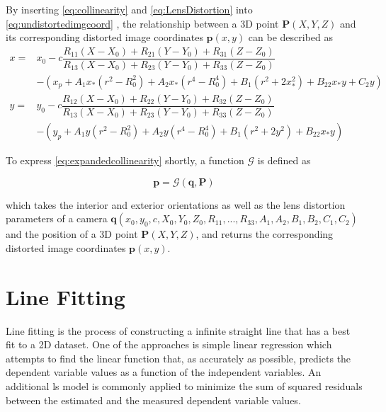 By inserting \eqref{eq:collinearity} and \eqref{eq:LensDistortion} into \eqref{eq:undistortedimgcoord} , the relationship between a 3D point $\mathbf{P}(X, Y, Z)$ and its corresponding distorted image coordinates $\mathbf{p}(x,y)$ can be described as
\begin{equation} \label{eq:expandedcollinearity}
\begin{split}
x =& x_0-c\dfrac{R_{11}(X-X_0)+R_{21}(Y-Y_0)+R_{31}(Z-Z_0)}{R_{13}(X-X_0)+R_{23}(Y-Y_0)+R_{33}(Z-Z_0)} \\
&-(x_p + A_1x_*(r^2-R_0^2) + A_2x_*(r^4-R_0^4) + B_1(r^2+2x_*^2) + B_22x_*y+C_2y)\\
y =& y_0-c\dfrac{R_{12}(X-X_0)+R_{22}(Y-Y_0)+R_{32}(Z-Z_0)}{R_{13}(X-X_0)+R_{23}(Y-Y_0)+R_{33}(Z-Z_0)} \\
&-(y_p + A_1y  (r^2-R_0^2) + A_2y  (r^4-R_0^4) + B_1(r^2+2y^2)   + B_22x_*y)
\end{split}
\end{equation}

To express \eqref{eq:expandedcollinearity} shortly, a function $\mathcal{G}$ is defined as

\begin{equation} \label{eq:Gfunction}
\mathbf{p} = \mathcal{G}(\mathbf{q},\mathbf{P}) 
\end{equation}

which takes the interior and exterior orientations as well as the lens distortion parameters of a camera $\mathbf{q}(x_0,y_0,c,X_0,Y_0,Z_0,R_{11},...,R_{33},A_1,A_2,B_1,B_2,C_1,C_2)$ and the position of a 3D point $\mathbf{P}(X, Y, Z)$, and returns the corresponding distorted image coordinates $\mathbf{p}(x,y)$.


\section{Line Fitting}
\label{sec:LineFitting}

Line fitting is the process of constructing a infinite straight line that has a best fit to a 2D dataset. One of the approaches is simple linear regression which attempts to find the linear function that, as accurately as possible, predicts the dependent variable values as a function of the independent variables. An additional \gls{ls} model is commonly applied to minimize the sum of squared residuals between the estimated and the measured dependent variable values.

